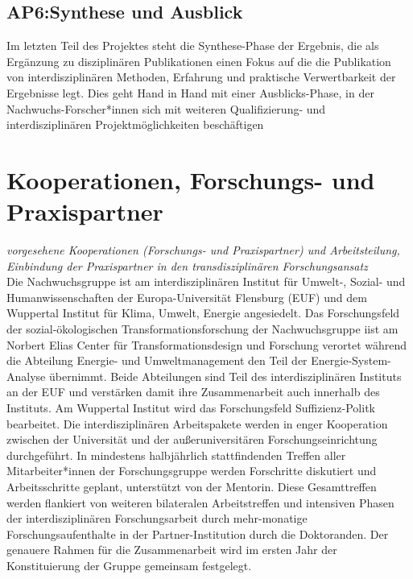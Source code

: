 \documentclass[a4paper,11pt,twoside]{scrartcl}
\begin{document}
\subsection*{AP6:Synthese und Ausblick}
Im letzten Teil des Projektes steht die Synthese-Phase der Ergebnis, die als Ergänzung zu disziplinären Publikationen einen Fokus auf die die Publikation von interdisziplinären Methoden, Erfahrung und praktische Verwertbarkeit der Ergebnisse legt. Dies geht Hand in Hand mit einer Ausblicks-Phase, in der Nachwuchs-Forscher*innen sich mit weiteren Qualifizierung- und interdisziplinären Projektmöglichkeiten beschäftigen

\section{Kooperationen, Forschungs- und Praxispartner}
\textit{vorgesehene Kooperationen (Forschungs- und Praxispartner) und Arbeitsteilung, Einbindung der Praxispartner in den transdisziplinären Forschungsansatz}\\

Die Nachwuchsgruppe ist am interdisziplinären Institut für Umwelt-, Sozial- und Humanwissenschaften der Europa-Universität Flensburg (EUF) und dem Wuppertal Institut für Klima, Umwelt, Energie angesiedelt. Das Forschungsfeld der sozial-ökologischen Transformationsforschung der Nachwuchsgruppe iist am Norbert Elias Center für Transformationsdesign und Forschung verortet während die Abteilung Energie- und Umweltmanagement den Teil der Energie-System-Analyse übernimmt. Beide Abteilungen sind Teil des interdisziplinären Instituts an der EUF und verstärken damit ihre Zusammenarbeit auch innerhalb des Instituts. Am Wuppertal Institut wird das Forschungsfeld Suffizienz-Politk bearbeitet. Die interdisziplinären Arbeitspakete werden in enger Kooperation zwischen der Universität und der außeruniversitären Forschungseinrichtung durchgeführt. In mindestens halbjährlich stattfindenden Treffen aller Mitarbeiter*innen der Forschungsgruppe werden Forschritte diskutiert und Arbeitsschritte geplant, unterstützt von der Mentorin. Diese Gesamttreffen werden flankiert von weiteren bilateralen Arbeitstreffen und intensiven Phasen der interdisziplinären Forschungsarbeit durch mehr-monatige Forschungsaufenthalte in der Partner-Institution durch die Doktoranden. Der genauere Rahmen für die Zusammenarbeit wird im ersten Jahr der Konstituierung der Gruppe gemeinsam festgelegt.
\end{document}
